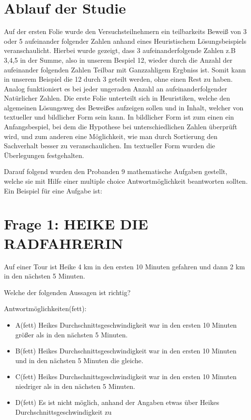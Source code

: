 \section{Ablauf der Studie}

Auf der ersten Folie wurde den Versuchsteilnehmern ein teilbarkeits Beweiß von 3 oder 5 aufeinander folgender Zahlen anhand eines Heuristischem Lösungsbeispiels veranschaulicht. Hierbei wurde gezeigt, dass 3 aufeinanderfolgende Zahlen z.B 3,4,5 in der Summe, also in unserem Bespiel 12, wieder durch die Anzahl der aufeinander folgenden Zahlen Teilbar mit Ganzzahligem Ergbniss ist. Somit kann in unserem Beispiel die 12 durch 3 geteilt werden, ohne einen Rest zu haben.
Analog funktioniert es bei jeder ungeraden Anzahl an aufeinanderfolgender Natürlicher Zahlen. Die erste Folie unterteilt sich in Heuristiken, welche den algemeinen Lösungsweg des Beweißes aufzeigen sollen und in Inhalt, welcher von textueller und bildlicher Form sein kann. In bildlicher Form ist zum einen ein Anfangsbespiel, bei dem die Hypothese bei unterschiedlichen Zahlen überprüft wird, und zum anderen eine Möglichkeit, wie man durch Sortierung den Sachverhalt besser zu veranschaulichen. Im textueller Form wurden die Überlegungen festgehalten.

Darauf folgend wurden den Probanden 9 mathematische Aufgaben gestellt, welche sie mit Hilfe einer multiple choice Antwortmöglichkeit beantworten sollten. Ein Beispiel für eine Aufgabe ist:

\section*{Frage 1: HEIKE DIE RADFAHRERIN}

Auf einer Tour ist Heike 4 km in den ersten 10 Minuten gefahren und dann 2 km in den
nächsten 5 Minuten.


Welche der folgenden Aussagen ist richtig?

Antwortmöglichkeiten(fett):
    \begin{itemize}
        \item A(fett) Heikes Durchschnittsgeschwindigkeit war in den ersten 10 Minuten größer als in den nächsten 5
            Minuten.
        \item B(fett) Heikes Durchschnittsgeschwindigkeit war in den ersten 10 Minuten und in den nächsten 5
            Minuten die gleiche.
        \item C(fett) Heikes Durchschnittsgeschwindigkeit war in den ersten 10 Minuten niedriger als in den nächsten
            5 Minuten.
        \item D(fett) Es ist nicht möglich, anhand der Angaben etwas über Heikes Durchschnittsgeschwindigkeit zu
    \end{itemize}


